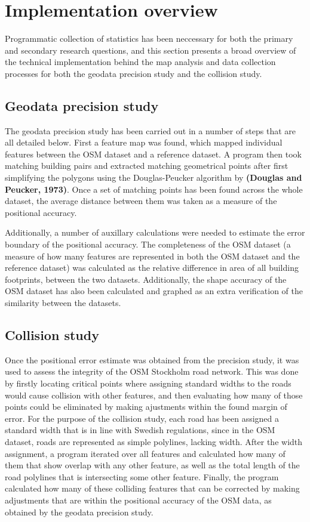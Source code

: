 \documentclass{kththesis}
\begin{document}
\section{Implementation overview}

Programmatic collection of statistics has been neccessary for both the primary and secondary research questions, and this section presents a broad overview of the technical implementation behind the map analysis and data collection processes for both the geodata precision study and the collision study.

\subsection{Geodata precision study}

The geodata precision study has been carried out in a number of steps that are all detailed below.
First a feature map was found, which mapped individual features between the OSM dataset and a reference dataset.
A program then took matching building pairs and extracted matching geometrical points after first simplifying the polygons using the Douglas-Peucker algorithm by \textbf{(Douglas and Peucker, 1973)}.
Once a set of matching points has been found across the whole dataset, the average distance between them was taken as a measure of the positional accuracy.

Additionally, a number of auxillary calculations were needed to estimate the error boundary of the positional accuracy.
The completeness of the OSM dataset (a measure of how many features are represented in both the OSM dataset and the reference dataset) was calculated as the relative difference in area of all building footprints, between the two datasets.
Additionally, the shape accuracy of the OSM dataset has also been calculated and graphed as an extra verification of the similarity between the datasets.

\subsection{Collision study}

Once the positional error estimate was obtained from the precision study, it was used to assess the integrity of the OSM Stockholm road network.
This was done by firstly locating critical points where assigning standard widths to the roads would cause collision with other features, and then evaluating how many of those points could be eliminated by making ajustments within the found margin of error.
For the purpose of the collision study, each road has been assigned a standard width that is in line with Swedish regulations, since in the OSM dataset, roads are represented as simple polylines, lacking width.
After the width assignment, a program iterated over all features and calculated how many of them that show overlap with any other feature, as well as the total length of the road polylines that is intersecting some other feature.
Finally, the program calculated how many of these colliding features that can be corrected by making adjustments that are within the positional accuracy of the OSM data, as obtained by the geodata precision study.
\end{document}
